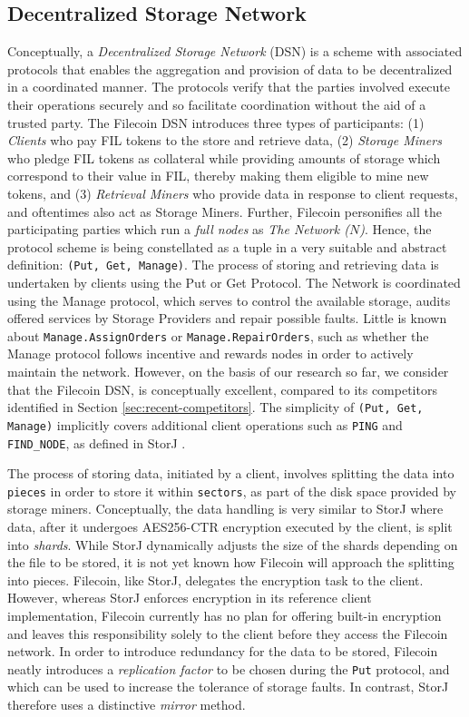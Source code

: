 \documentclass[conference]{IEEEtran}
\begin{document}
\subsection{Decentralized Storage Network}
\label{subsec:dsn}
Conceptually, a \textit{Decentralized Storage Network} (DSN) is a scheme with associated protocols that enables the aggregation and provision of data to be decentralized in a coordinated manner.
The protocols verify that the parties involved execute their operations securely and so facilitate coordination without the aid of a trusted party.
The Filecoin DSN introduces three types of participants: (1) \textit{Clients} who pay FIL tokens to the store and retrieve data, (2) \textit{Storage Miners} who pledge FIL tokens as collateral while providing amounts of storage which correspond to their value in FIL, thereby making them eligible to mine new tokens, and (3) \textit{Retrieval Miners} who provide data in response to client requests, and oftentimes also act as Storage Miners.
Further, Filecoin personifies all the participating parties which run a \textit{full nodes} as \textit{The Network ($N$)}.
Hence, the protocol scheme is being constellated as a tuple in a very suitable and abstract definition: \texttt{(Put, Get, Manage)}.
The process of storing and retrieving data is undertaken by clients using the Put or  Get Protocol.
The Network is coordinated using the Manage protocol, which serves to control the available storage, audits offered services by Storage Providers and repair possible faults.
Little is known about \texttt{Manage.AssignOrders} or \texttt{Manage.RepairOrders}, such as whether the Manage protocol follows incentive and rewards nodes in order to actively maintain the network.
However, on the basis of our research so far, we consider that the Filecoin DSN, is conceptually excellent, compared to its competitors identified in Section \ref{sec:recent-competitors}.
The simplicity of \texttt{(Put, Get, Manage)} implicitly covers additional client operations such as \texttt{PING} and \texttt{FIND\_NODE}, as defined in StorJ \cite{storj}.

The process of storing data, initiated by a client, involves splitting the data into \texttt{pieces} in order to store it within \texttt{sectors}, as part of the disk space provided by storage miners.
Conceptually, the data handling is very similar to StorJ\cite{storj} where data, after it undergoes AES256-CTR encryption executed by the client, is split into \textit{shards}.
While StorJ dynamically adjusts the size of the shards depending on the file to be stored, it is not yet known how Filecoin will approach the splitting into pieces.
Filecoin, like StorJ, delegates the encryption task to the client.
However, whereas StorJ enforces encryption in its reference client implementation, Filecoin currently has no plan for offering built-in encryption and leaves this responsibility solely to the client before they access the Filecoin network.
In order to introduce redundancy for the data to be stored, Filecoin neatly introduces a \textit{replication factor} to be chosen during the \texttt{Put} protocol, and which can be used to increase the tolerance of storage faults.
In contrast, StorJ therefore uses a distinctive \textit{mirror} method.
\end{document}
